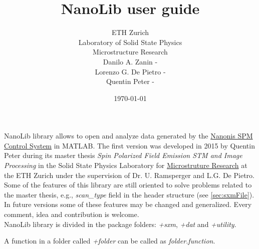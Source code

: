 

\usepackage{amsmath}
\renewcommand{\familydefault}{\sfdefault}
\setlength\parindent{0pt}


\newcommand{\+}[1]{\item \textbf{#1}}
\newcommand{\nanonis}{\href{http://www.specs-zurich.com/en/home.html;jsessionid=FCD8A587EE447665C3F4A8CC374671EE}{Nanonis SPM Control System\texttrademark}}
\newcommand{\matlab}{MATLAB\texttrademark}

\title{NanoLib user guide}
\author{
ETH Zurich\\
Laboratory of Solid State Physics\\\vspace{.5em}
Microstructure Research\\ 
{\small Danilo A. Zanin - }\\
{\small Lorenzo G. De Pietro - }\\
{\small Quentin Peter - }
}

\date{\today}


\maketitle
NanoLib library allows to open and analyze data generated by the \nanonis{} in \matlab.
The first version was developed in 2015 by Quentin Peter during its master thesis \emph{Spin Polarized Field Emission STM and Image Processing} in the Solid State Physics Laboratory for \href{http://www.microstructure.ethz.ch}{Microstruture Research} at the ETH Zurich under the supervision of Dr. U. Ramsperger and L.G. De Pietro.
Some of the features of this library are still oriented to solve problems related to the master  thesis, e.g., \emph{scan\_type} field in the header structure (see \ref{sec:sxmFile}). 
In future versions some of these features may be changed and generalized. Every comment, idea and contribution is welcome.\\

NanoLib library is divided in the package folders: \emph{+sxm}, \emph{+dat} and \emph{+utility}.

A function in a folder called \emph{+folder} can be called as \emph{folder.function}.\\

